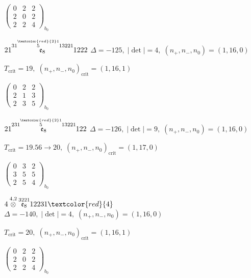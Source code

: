 \documentclass[10pt]{article}
\begin{document}
\hspace{2em}$\left(\begin{smallmatrix}0 & 2 & 2 \\ 2 & 0 & 2 \\ 2 & 2 & 4\end{smallmatrix}\right)_{\!b_0}$

\smallskip

$21\overset{31\overset{\textcolor{red}{2}1}{5}13221}{\mathfrak{e}_8}1222$ \quad $\Delta=-125,\; |\det|=4,\; (n_+,n_-,n_0)=(1,16,0)$

\hspace{1em}$T_{\text{crit}}=19,\; (n_+,n_-,n_0)_{\text{crit}}=(1,16,1)$

\hspace{2em}$\left(\begin{smallmatrix}0 & 2 & 2 \\ 2 & 1 & 3 \\ 2 & 3 & 5\end{smallmatrix}\right)_{\!b_0}$

\smallskip

$21\overset{231\overset{\textcolor{red}{2}1}{5}13221}{\mathfrak{e}_8}122$ \quad $\Delta=-126,\; |\det|=9,\; (n_+,n_-,n_0)=(1,16,0)$

\hspace{1em}$T_{\text{crit}}=19.56 \to 20,\; (n_+,n_-,n_0)_{\text{crit}}=(1,17,0)$

\hspace{2em}$\left(\begin{smallmatrix}0 & 3 & 2 \\ 3 & 5 & 5 \\ 2 & 5 & 4\end{smallmatrix}\right)_{\!b_0}$

\smallskip

$4\overset{4,2}{\otimes}\overset{3221}{\mathfrak{e}_8}12231\textcolor{red}{4}$ \quad $\Delta=-140,\; |\det|=4,\; (n_+,n_-,n_0)=(1,16,0)$

\hspace{1em}$T_{\text{crit}}=20,\; (n_+,n_-,n_0)_{\text{crit}}=(1,16,1)$

\hspace{2em}$\left(\begin{smallmatrix}0 & 2 & 2 \\ 2 & 0 & 2 \\ 2 & 2 & 4\end{smallmatrix}\right)_{\!b_0}$
\end{document}
